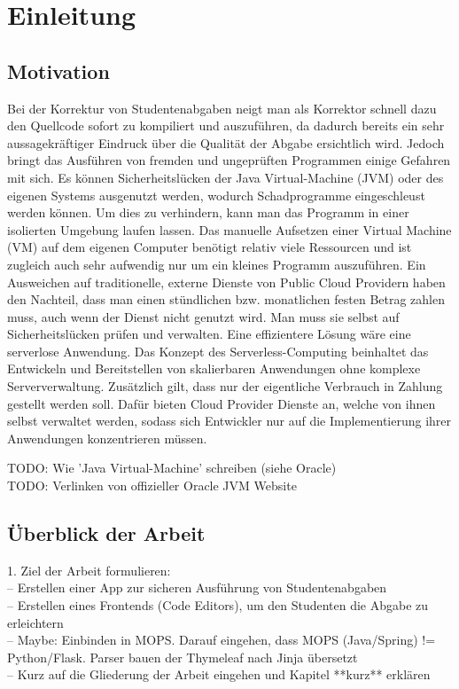 \chapter{Einleitung}

\section{Motivation}
Bei der Korrektur von Studentenabgaben neigt man als Korrektor schnell dazu den Quellcode
sofort zu kompiliert und auszuführen, da dadurch bereits ein sehr aussagekräftiger Eindruck
über die Qualität der Abgabe ersichtlich wird. Jedoch bringt das Ausführen von fremden und ungeprüften Programmen einige Gefahren mit sich.
Es können Sicherheitslücken der Java Virtual-Machine (JVM)
oder des eigenen Systems ausgenutzt werden, wodurch Schadprogramme eingeschleust werden können.
Um dies zu verhindern, kann man das Programm in einer isolierten Umgebung laufen lassen.
Das manuelle Aufsetzen einer Virtual Machine (VM) auf dem eigenen Computer benötigt relativ
viele Ressourcen und ist zugleich auch sehr aufwendig nur um ein kleines Programm auszuführen.
Ein Ausweichen auf traditionelle, externe Dienste von Public Cloud Providern haben den Nachteil,
dass man einen stündlichen bzw. monatlichen festen Betrag zahlen muss,
auch wenn der Dienst nicht genutzt wird.
Man muss sie selbst auf Sicherheitslücken prüfen und verwalten.
Eine effizientere Lösung wäre eine serverlose Anwendung.
Das Konzept des Serverless-Computing beinhaltet das Entwickeln und Bereitstellen
von skalierbaren Anwendungen ohne komplexe Serververwaltung. Zusätzlich gilt,
dass nur der eigentliche Verbrauch in Zahlung gestellt werden soll.
Dafür bieten Cloud Provider Dienste an, welche von ihnen selbst verwaltet werden,
sodass sich Entwickler nur auf die Implementierung ihrer Anwendungen konzentrieren müssen.

TODO: Wie 'Java Virtual-Machine' schreiben (siehe Oracle)\\
TODO: Verlinken von offizieller Oracle JVM Website


\section{Überblick der Arbeit}
1. Ziel der Arbeit formulieren:\\
-- Erstellen einer App zur sicheren Ausführung von Studentenabgaben\\
-- Erstellen eines Frontends (Code Editors), um den Studenten die Abgabe zu erleichtern\\
-- Maybe: Einbinden in MOPS. Darauf eingehen, dass MOPS (Java/Spring) != Python/Flask.
Parser bauen der Thymeleaf nach Jinja übersetzt\\
-- Kurz auf die Gliederung der Arbeit eingehen und Kapitel **kurz** erklären\\